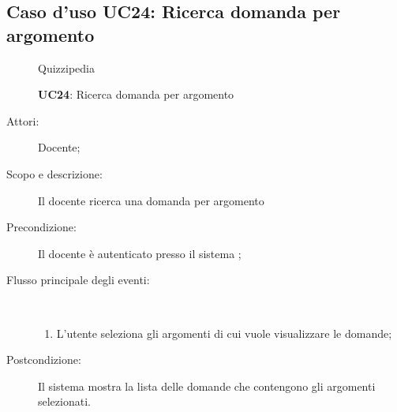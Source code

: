 \subsection{Caso d'uso UC24: Ricerca domanda per argomento}
	\begin{figure}[H]
		\centering
		\begin{resizedtikzpicture}{\textwidth}
		\begin{umlsystem}[x=0, fill=lightgray!20]{Quizzipedia}
		\end{umlsystem}
		\end{resizedtikzpicture}
		\caption{\textbf{UC24}: Ricerca domanda per argomento}
		\label{UC24}
	\end{figure}
\begin{description}
\item[Attori:] Docente;
\item[Scopo e descrizione:] Il docente ricerca una domanda per argomento
      \item[Precondizione:] Il docente è autenticato presso il sistema
;

        \item[Flusso principale degli eventi:] \ 
 \begin{enumerate}
          \item L'utente seleziona gli argomenti di cui vuole visualizzare le domande;

      \end{enumerate}
    \item[Postcondizione:] Il sistema mostra la lista delle domande che contengono gli argomenti selezionati.
  \end{description}
\hypertarget{UC25}{}
